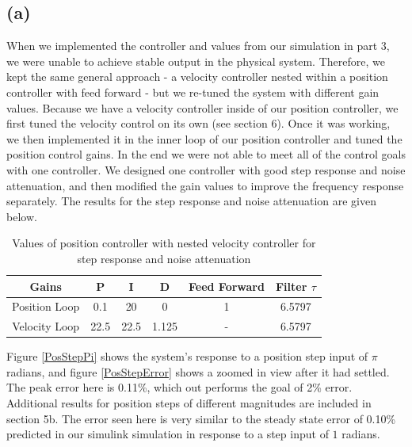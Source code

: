 \documentclass[letterpaper]{article}
\begin{document}
\subsection*{(a)}
When we implemented the controller and values from our simulation in part 3, we were unable to achieve stable output in the physical system. Therefore, we kept the same general approach - a velocity controller nested within a position controller with feed forward - but we re-tuned the system with different gain values. Because we have a velocity controller inside of our position controller, we first tuned the velocity control on its own (see section 6). Once it was working, we then implemented it in the inner loop of our position controller and tuned the position control gains. In the end we were not able to meet all of the control goals with one controller. We designed one controller with good step response and noise attenuation, and then modified the gain values to improve the frequency response separately. The results for the step response and noise attenuation are given below.\\


\begin{table}[htb]
\begin{center}
    \begin{tabular}{|c|c|c|c|c|c|}
        \hline
        Gains & P   & I & D   & Feed Forward   & Filter $\tau$   \\ \hline
        Position Loop            & 0.1 & 20  & 0 & 1 & 6.5797    \\ 
        Velocity Loop       & 22.5   & 22.5    & 1.125   & -  & 6.5797  \\ 
       \hline
    \end{tabular}
\end{center}
\caption{Values of position controller with nested velocity controller for step response and noise attenuation}
\label{positionGains}
\end{table}

Figure \ref{PosStepPi} shows the system's response to a position step input of $\pi$ radians, and figure \ref{PosStepError} shows a zoomed in view after it had settled. The peak error here is 0.11\%, which out performs the goal of 2\% error. Additional results for position steps of different magnitudes are included in section 5b.  The error seen here is very similar to the steady state error of 0.10\% predicted in our simulink simulation in response to a step input of $1$ radians.\\
\end{document}

